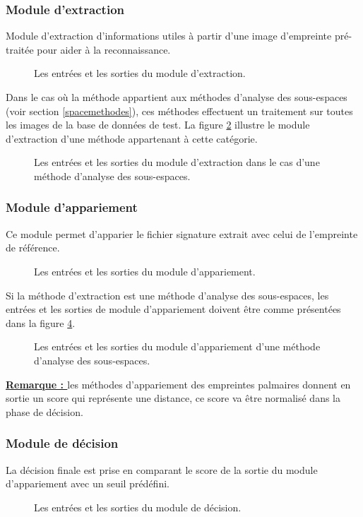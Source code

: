 \subsubsection{Module d’extraction}
Module d'extraction d'informations utiles à partir d'une image d'empreinte pré-traitée pour aider à la reconnaissance.
\begin{figure}[H]
	\centering
	
	\caption{Les entrées et les sorties du module d'extraction.}
	\label{extModule}
\end{figure}
Dans le cas où la méthode appartient aux méthodes d'analyse des sous-espaces (voir section \ref{spacemethodes}), ces méthodes effectuent un traitement sur toutes les images de la base de données de test. La figure \ref{extModule2} illustre le module d'extraction d'une méthode appartenant à cette catégorie.
\begin{figure}[H]
	\centering
	\caption{Les entrées et les sorties du module d'extraction dans le cas d'une méthode d'analyse des sous-espaces.}
	\label{extModule2}
\end{figure}
\subsubsection{Module d’appariement}
Ce module permet d’apparier le fichier signature extrait avec celui de l’empreinte de référence.
\begin{figure}[H]
	\centering
	\caption{Les entrées et les sorties du module d'appariement.}
	\label{appModule}
\end{figure}
Si la méthode d'extraction est une méthode d'analyse des sous-espaces, les entrées et les sorties de module d'appariement doivent être comme présentées dans la figure \ref{appModule2}.

\begin{figure}[H]
	\centering
	\caption{Les entrées et les sorties du module d'appariement d'une méthode d'analyse des sous-espaces.}
	\label{appModule2}
\end{figure}
\textbf{\underline{Remarque : }}
les méthodes d’appariement des empreintes palmaires donnent en sortie un score qui représente une distance, ce score va être normalisé dans la phase de décision. 
\clearpage
\subsubsection{Module de décision}
La décision finale est prise en comparant le score de la sortie du module d’appariement avec un seuil prédéfini.
\begin{figure}[H]
	\centering
	
	\caption{Les entrées et les sorties du module de décision.}
	\label{decModule}
\end{figure}
